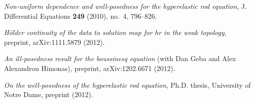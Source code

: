 \documentclass[12pt]{article}
\begin{document}
\nocite{Geba:2012}
\nocite{Karapetyan:2010fk}
\nocite{Karapetyan:2011}
\nocite{Karapetyan:2012}
\large
\providecommand{\bysame}{\leavevmode\hbox to3em{\hrulefill}\thinspace}
\providecommand{\MR}{\relax\ifhmode\unskip\space\fi MR }
\providecommand{\MRhref}[2]{%
  \href{http://www.ams.org/mathscinet-getitem?mr=#1}{#2}
}
\providecommand{\href}[2]{#2}
\begin{thebibliography}{1}

\href{http://davidkarapetyan.com/pdfs/hr-nud-2010.pdf}{\emph{Non-uniform dependence and well-posedness for the
hyperelastic rod equation}}, J. Differential Equations \textbf{249} (2010),
  no.~4, 796--826.

\href{http://arxiv.org/abs/1111.5879}{\emph{H{\"o}lder continuity of the data to solution map for hr in the
weak topology}}, preprint, arXiv:1111.5879 (2012).

\href{http://arxiv.org/abs/1202.6671}{\emph{An
ill-posedness result for the boussinesq equation}} (with Dan Geba and Alex Alexandrou Himonas), preprint, arXiv:1202.6671
  (2012).

\href{http://davidkarapetyan.com/pdfs/thesis.pdf}{\emph{On the well-posedness of the hyperelastic rod equation}}, Ph.D.
thesis, University of Notre Dame, preprint (2012).

\end{thebibliography}
        
        
\end{document}
